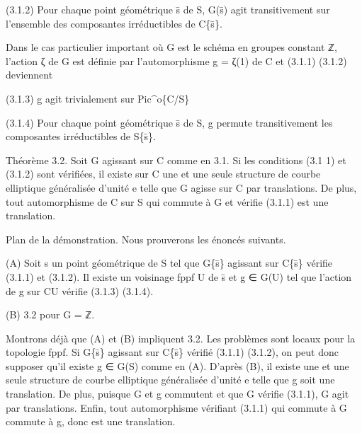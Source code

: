 \documentclass[11pt,a4paper]{article}
\begin{document}
(3.1.2)        Pour chaque point géométrique s̄ de S, G(s̄) agit transitivement sur l'ensemble des composantes irréductibles de C\textunderscore{}\{s̄\}.

Dans le cas particulier important où G est le schéma en groupes constant ℤ, l'action ζ de G est définie par l'automorphisme g = ζ(1) de C et (3.1.1) (3.1.2) deviennent

(3.1.3)        g agit trivialement sur Pic\textasciicircum{}o\textunderscore{}\{C/S\}

(3.1.4)        Pour chaque point géométrique s̄ de S, g permute transitivement les composantes irréductibles de S\textunderscore{}\{s̄\}.

Théorème 3.2. Soit G agissant sur C comme en 3.1. Si les conditions (3.1 1) et (3.1.2) sont vérifiées, il existe sur C une et une seule structure de courbe elliptique généralisée d'unité e telle que G agisse sur C par translations. De plus, tout automorphisme de C sur S qui commute à G et vérifie (3.1.1) est une translation.

Plan de la démonstration. Nous prouverons les énoncés suivants.

(A) Soit s un point géométrique de S tel que G\textunderscore{}\{s̄\} agissant sur C\textunderscore{}\{s̄\} vérifie (3.1.1) et (3.1.2). Il existe un voisinage fppf U de s̄ et g ∈ G(U) tel que l'action de g sur C\textunderscore{}U vérifie (3.1.3) (3.1.4).

(B) 3.2 pour G = ℤ.

Montrons déjà que (A) et (B) impliquent 3.2. Les problèmes sont locaux pour la topologie fppf. Si G\textunderscore{}\{s̄\} agissant sur C\textunderscore{}\{s̄\} vérifié (3.1.1) (3.1.2), on peut donc supposer qu'il existe g ∈ G(S) comme en (A). D'après (B), il existe une et une seule structure de courbe elliptique généralisée d'unité e telle que g soit une translation. De plus, puisque G et g commutent et que G vérifie (3.1.1), G agit par translations. Enfin, tout automorphisme vérifiant (3.1.1) qui commute à G commute à g, donc est une translation.
\end{document}
